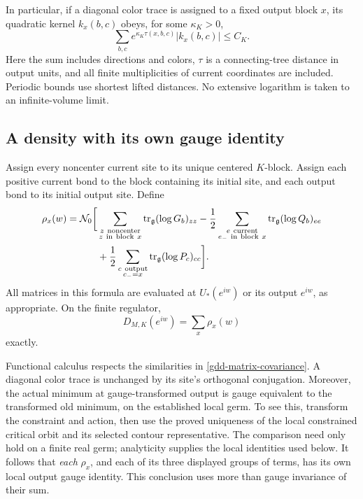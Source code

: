 In particular, if a diagonal color trace is assigned
to a fixed output block \(x\), its quadratic kernel
\(k_x(b,c)\) obeys, for some \(\kappa_K>0\),
\begin{equation}
 \sum_{b,c}e^{\kappa_K\tau(x,b,c)}|k_x(b,c)|\le C_K.
 \label{gdd-rooted-kernel}
\end{equation}
Here the sum includes directions and colors, \(\tau\)
is a connecting-tree distance in output units, and all
finite multiplicities of current coordinates are included.
Periodic bounds use shortest lifted distances. No extensive
logarithm is taken to an infinite-volume limit.

\subsection{A density with its own gauge identity}
\label{gdd-density-section}

Assign every noncenter current site to its unique centered
\(K\)-block. Assign each positive current bond to the block
containing its initial site, and each output bond to its
initial output site. Define
\begin{align}
 \rho_x(w)=\mathcal N_0\bigg[
 &\sum_{\substack{z\ {\rm noncenter}\\z\ {\rm in\ block}\ x}}
                   \operatorname{tr}_{\mathfrak g}(\log G_b)_{zz}
 -\frac12\sum_{\substack{e\ {\rm current}\\e_-\ {\rm in\ block}\ x}}
                   \operatorname{tr}_{\mathfrak g}(\log Q_b)_{ee}
 \notag\\
 &+\frac12\sum_{\substack{c\ {\rm output}\\c_-=x}}
                   \operatorname{tr}_{\mathfrak g}(\log P_c)_{cc}
 \bigg].
 \label{gdd-density}
\end{align}
All matrices in this formula are evaluated at \(U_*(e^{iw})\)
or its output \(e^{iw}\), as appropriate. On the finite
regulator,
\begin{equation}
                         D_{M,K}(e^{iw})=\sum_x\rho_x(w)
 \label{gdd-density-total}
\end{equation}
exactly.

Functional calculus respects the similarities in
\eqref{gdd-matrix-covariance}. A diagonal color trace is
unchanged by its site's orthogonal conjugation. Moreover,
the actual minimum at gauge-transformed output is gauge
equivalent to the transformed old minimum, on the established
local germ. To see this, transform the constraint and action,
then use the proved uniqueness of the local constrained
critical orbit and its selected contour representative.
The comparison need only hold on a finite real germ;
analyticity supplies the local identities used below.
It follows that \emph{each} \(\rho_x\), and each of its
three displayed groups of terms, has its own local
output gauge identity. This conclusion uses more than
gauge invariance of their sum.


